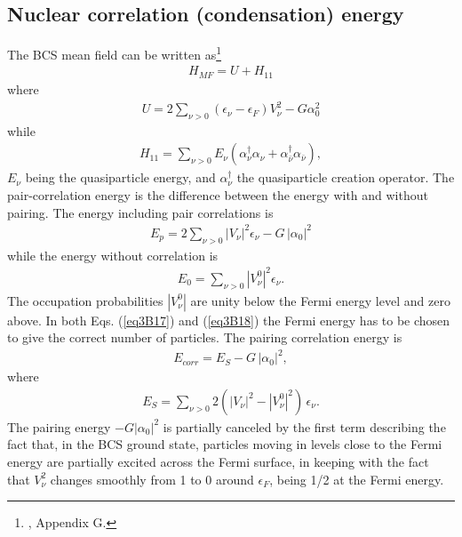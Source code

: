 \begin{subappendices}
\subsection{Nuclear correlation (condensation) energy}\label{App3B4}
The BCS mean field can be written as\footnote{\cite{Brink:05}, Appendix G.}
 \begin{align}\label{eq3B14}
H_{MF}=U+H_{11}
 \end{align} 
where
 \begin{align}\label{eq3B15}
 U=2\sum_{\nu>0}(\epsilon_\nu-\epsilon_F)V_\nu^2-G\alpha_0^2
 \end{align} 
while
 \begin{align}\label{eq3B16}
H_{11}=\sum_{\nu>0}E_\nu(\alpha_\nu^\dagger\alpha_\nu+\alpha_{\bar\nu}^\dagger\alpha_{\bar\nu}),
 \end{align} 
$E_\nu$ being the quasiparticle energy, and $\alpha^\dagger_\nu$ the quasiparticle creation operator. The pair-correlation energy is the difference between the energy with and without pairing. The energy including pair correlations is
 \begin{align}\label{eq3B17}
E_p=2\sum_{\nu>0}|V_\nu|^2\epsilon_\nu-G\,|\alpha_0|^2
 \end{align} 
 while the energy without correlation is
  \begin{align}\label{eq3B18}
  E_0=\sum_{\nu>0}|V^0_\nu|^2\epsilon_\nu.
  \end{align} 
 The occupation probabilities $|V^0_\nu|$ are unity below the Fermi energy level and zero above. In both Eqs. (\ref{eq3B17}) and (\ref{eq3B18}) the Fermi energy has to be chosen to give the correct number of particles. The pairing correlation energy is 
   \begin{align}\label{eq3B19}
E_{corr}=E_S-G\,|\alpha_0|^2,
   \end{align} 
 where
   \begin{align}\label{eq3B20}
E_S=\sum_{\nu>0}2(|V_\nu|^2-|V^0_\nu|^2)\,\epsilon_\nu.
   \end{align}  
 The  pairing energy $-G|\alpha_0|^2$ is partially canceled by the first term describing the fact that, in the BCS ground state, particles moving in levels close to the Fermi energy are partially excited across the Fermi surface, in keeping with the fact that $V_\nu^2$ changes smoothly from 1 to 0 around $\epsilon_F$, being 1/2 at the Fermi energy.
 

\end{subappendices}
